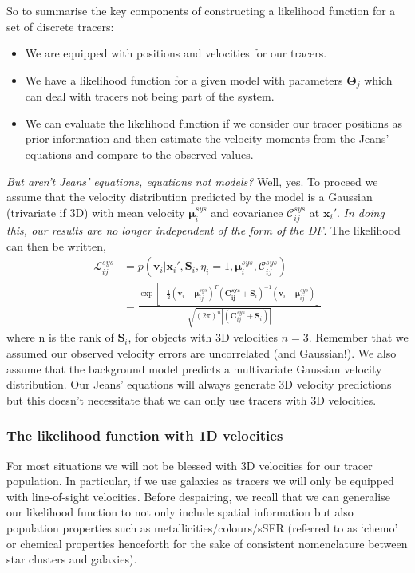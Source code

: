 So to summarise the key components of constructing a likelihood function for a set of discrete tracers: 
\begin{itemize}
    \item We are equipped with positions and velocities for our tracers.
    \item We have a likelihood function for a given model with parameters $\boldsymbol{\Theta}_{j}$ which can deal with tracers not being part of the system.
    \item We can evaluate the likelihood function if we consider our tracer positions as prior information and then estimate the velocity moments from the Jeans' equations and compare to the observed values.
\end{itemize}
\textit{But aren't Jeans' equations, equations not models?} Well, yes. To proceed we assume that the velocity distribution predicted by the model is a Gaussian (trivariate if 3D) with mean velocity $\boldsymbol{\mu}_{i}^{sys}$ and covariance $\boldsymbol{\mathcal{C}}_{ij}^{sys}$ at $\boldsymbol{x}_i'$. \textit{In doing this, our results are no longer independent of the form of the DF}. The likelihood can then be written, 
\begin{align*}
\mathcal{L}_{ij}^{sys} &= p(\boldsymbol{v}_i|\boldsymbol{x}_{i}',\boldsymbol{S}_i,\eta_i=1,\boldsymbol{\mu}_{i}^{sys},\boldsymbol{\mathcal{C}}_{ij}^{sys}) \\ &= \frac{\exp{\left[-\frac{1}{2}(\boldsymbol{v}_i - \boldsymbol{\mu}_{ij}^{sys})^{T}(\boldsymbol{C_{ij}^{sys}} + \boldsymbol{S}_i)^{-1}(\boldsymbol{v}_i - \boldsymbol{\mu}_{ij}^{sys}) \right]}}{\sqrt{(2\pi)^{n}|(\boldsymbol{C}_{ij}^{sys}+\boldsymbol{S}_i)|}}
\end{align*}
where n is the rank of $\boldsymbol{S}_i$, for objects with 3D velocities $n=3$. Remember that we assumed our observed velocity errors are uncorrelated (and Gaussian!). We also assume that the background model predicts a multivariate Gaussian velocity distribution. Our Jeans' equations will always generate 3D velocity predictions but this doesn't necessitate that we can only use tracers with 3D velocities. 

\subsubsection{The likelihood function with 1D velocities} 
For most situations we will not be blessed with 3D velocities for our tracer population. In particular, if we use galaxies as tracers we will only be equipped with line-of-sight velocities. Before despairing, we recall that we can generalise our likelihood function to not only include spatial information but also population properties such as metallicities/colours/sSFR (referred to as `chemo' or chemical properties henceforth for the sake of consistent nomenclature between star clusters and galaxies). 

